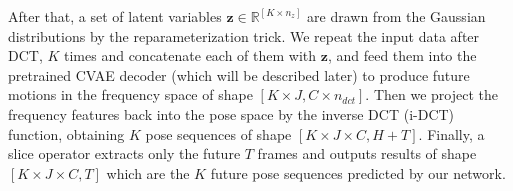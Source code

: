 \documentclass[sigconf,screen,nonacm]{acmart}
\begin{document}
	After that, a set of latent variables $\mathbf{z} \in \mathbb{R}^{[K \times n_z]}$ are drawn from the Gaussian distributions by the reparameterization trick.
	We repeat the input data after DCT, $K$ times and concatenate each of them with $\mathbf{z}$, and feed them into the pretrained CVAE decoder (which will be described later) to produce future motions in the frequency space of shape $[K \times J, C \times n_{dct}]$. Then we project the frequency features back into the pose space by the inverse DCT (i-DCT) function, obtaining $K$ pose sequences of shape $[K \times J \times C, H+T]$.
	Finally, a slice operator extracts only the future $T$ frames and outputs results of shape $[K \times J \times C, T]$ which are the $K$ future pose sequences predicted by our network.
	
	\begin{table}[!t]
		\caption{The network structure of $\mathbf{\mathcal{N}_{\beta}}$ and $\mathbf{\mathcal{N}_{\gamma}}$. For Human3.6M, $J=17$. For HumanEva-I, $J=15$. For both datasets, $M=40$, $K=50$, $C=3$, $F=256$, $n_{dct}=10$, $n_b=128$, $n_h=64$, $n_z=64$.}
		\label{tab:component_ours}
\end{table}
\end{document}
